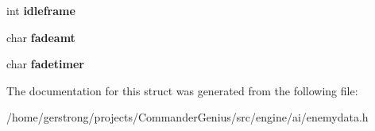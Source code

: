 \begin{DoxyCompactItemize}
\item 
\hypertarget{structst_teleport_data_a74c6402ad626c296937314d7a4841d2b}{
int {\bfseries idleframe}}
\label{structst_teleport_data_a74c6402ad626c296937314d7a4841d2b}

\item 
\hypertarget{structst_teleport_data_a57fbdad41c0469bd2f489e1e140f4c60}{
char {\bfseries fadeamt}}
\label{structst_teleport_data_a57fbdad41c0469bd2f489e1e140f4c60}

\item 
\hypertarget{structst_teleport_data_a2f907c50d6da653baf6ad4ff8a71a196}{
char {\bfseries fadetimer}}
\label{structst_teleport_data_a2f907c50d6da653baf6ad4ff8a71a196}

\end{DoxyCompactItemize}


The documentation for this struct was generated from the following file:\begin{DoxyCompactItemize}
\item 
/home/gerstrong/projects/CommanderGenius/src/engine/ai/enemydata.h\end{DoxyCompactItemize}

